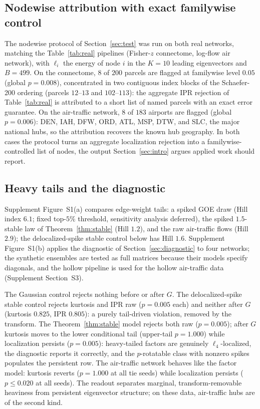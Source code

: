 \subsection{Nodewise attribution with exact familywise control}
\label{sec:exp-nodewise}

The nodewise protocol of Section~\ref{sec:test} was run on both real
networks, matching the Table~\ref{tab:real} pipelines
(Fisher-$z$ connectome, log-flow air network), with $\ell_i$ the
energy of node $i$ in the $K=10$ leading eigenvectors and $B=499$. On
the connectome, $8$ of $200$ parcels are flagged at familywise level
$0.05$ (global $p=0.008$), concentrated in two contiguous index
blocks of the Schaefer-200 ordering (parcels $12$--$13$ and
$102$--$113$): the aggregate IPR rejection of Table~\ref{tab:real}
is attributed to a short list of named parcels with an exact error
guarantee. On the air-traffic network, $8$ of $183$ airports are
flagged (global $p=0.006$): DEN, IAH, DFW, ORD, ATL, MSP, DTW, and
SLC, the major national hubs, so the attribution recovers the known
hub geography. In both cases the protocol turns an aggregate
localization rejection into a familywise-controlled list of nodes,
the output Section~\ref{sec:intro} argues applied work should
report.

\subsection{Heavy tails and the diagnostic}
\label{sec:exp-heavy}

Supplement Figure~S1(a) compares edge-weight tails: a spiked GOE draw
(Hill index $6.1$; fixed top-$5\%$ threshold, sensitivity analysis
deferred), the spiked $1.5$-stable law of
Theorem~\ref{thm:stable} (Hill $1.2$), and the raw air-traffic flows
(Hill $2.9$); the delocalized-spike stable control below has Hill
$1.6$. Supplement Figure~S1(b) applies the diagnostic of
Section~\ref{sec:diagnostic} to four networks; the synthetic ensembles
are tested as full matrices because their models specify diagonals, and
the hollow pipeline is used for the hollow air-traffic data (Supplement
Section~S3).

The Gaussian control rejects nothing before or after $G$. The
delocalized-spike stable control rejects kurtosis and IPR raw
($p=0.005$ each) and neither after $G$ (kurtosis $0.825$, IPR
$0.805$): a purely tail-driven violation, removed by the transform.
The Theorem~\ref{thm:stable} model rejects both raw ($p=0.005$);
after $G$ kurtosis moves to the lower conditional tail
(upper-tail $p=1.000$) while localization persists
($p=0.005$): heavy-tailed factors are genuinely $\ell_4$-localized,
the diagnostic reports it correctly, and the $p$-rotatable class with
nonzero spikes populates the persistent row. The
air-traffic network behaves like the factor model: kurtosis reverts
($p=1.000$ at all tie seeds) while localization persists
($p\le0.020$ at all seeds). The readout separates marginal,
transform-removable heaviness from persistent eigenvector structure; on
these data, air-traffic hubs are of the second kind.
